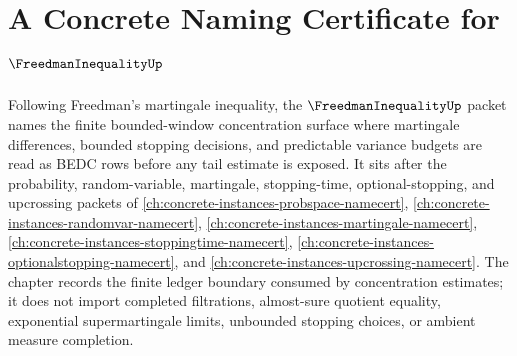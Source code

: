\chapter{A Concrete Naming Certificate for $\FreedmanInequalityUp$}
\label{ch:concrete-instances-freedman-inequality-namecert}

Following Freedman's martingale inequality, the $\FreedmanInequalityUp$ packet names the finite bounded-window concentration surface where martingale differences, bounded stopping decisions, and predictable variance budgets are read as BEDC rows before any tail estimate is exposed. It sits after the probability, random-variable, martingale, stopping-time, optional-stopping, and upcrossing packets of \autoref{ch:concrete-instances-probspace-namecert}, \autoref{ch:concrete-instances-randomvar-namecert}, \autoref{ch:concrete-instances-martingale-namecert}, \autoref{ch:concrete-instances-stoppingtime-namecert}, \autoref{ch:concrete-instances-optionalstopping-namecert}, and \autoref{ch:concrete-instances-upcrossing-namecert}. The chapter records the finite ledger boundary consumed by concentration estimates; it does not import completed filtrations, almost-sure quotient equality, exponential supermartingale limits, unbounded stopping choices, or ambient measure completion.

